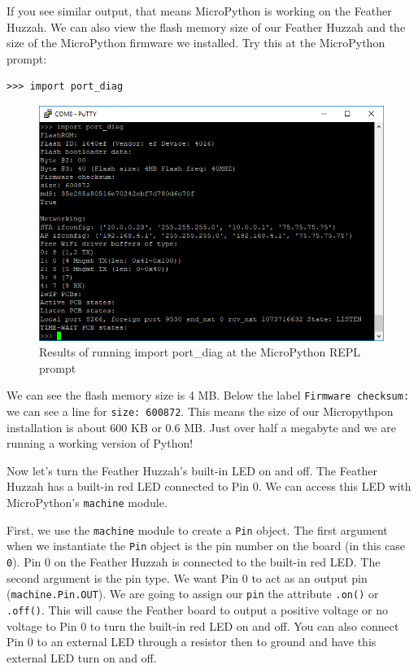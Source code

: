 \documentclass{book}
\makeatletter
\def\maxwidth{\ifdim\Gin@nat@width>\linewidth\linewidth
    \else\Gin@nat@width\fi}
\let\Oldincludegraphics\includegraphics
\renewcommand{\includegraphics}[1]{\Oldincludegraphics[width=.8\maxwidth]{#1}}
\makeatother
\begin{document}
If you see similar output, that means MicroPython is working on the
Feather Huzzah. We can also view the flash memory size of our Feather
Huzzah and the size of the MicroPython firmware we installed. Try this
at the MicroPython prompt:

\begin{lstlisting}
>>> import port_diag
\end{lstlisting}

\begin{figure}
\centering
\includegraphics{images/import_port_diag.PNG}
\caption{Results of running import port\_diag at the MicroPython REPL
prompt}
\end{figure}

We can see the flash memory size is 4 MB. Below the label
\lstinline!Firmware checksum:! we can see a line for
\lstinline!size: 600872!. This means the size of our Micropythpon
installation is about 600 KB or 0.6 MB. Just over half a megabyte and we
are running a working version of Python!

Now let's turn the Feather Huzzah's built-in LED on and off. The Feather
Huzzah has a built-in red LED connected to Pin 0. We can access this LED
with MicroPython's \lstinline!machine! module.

First, we use the \lstinline!machine! module to create a \lstinline!Pin!
object. The first argument when we instantiate the \lstinline!Pin!
object is the pin number on the board (in this case \lstinline!0!). Pin
0 on the Feather Huzzah is connected to the built-in red LED. The second
argument is the pin type. We want Pin 0 to act as an output pin
(\lstinline!machine.Pin.OUT!). We are going to assign our
\lstinline!pin! the attribute \lstinline!.on()! or \lstinline!.off()!.
This will cause the Feather board to output a positive voltage or no
voltage to Pin 0 to turn the built-in red LED on and off. You can also
connect Pin 0 to an external LED through a resistor then to ground and
have this external LED turn on and off.
\end{document}
